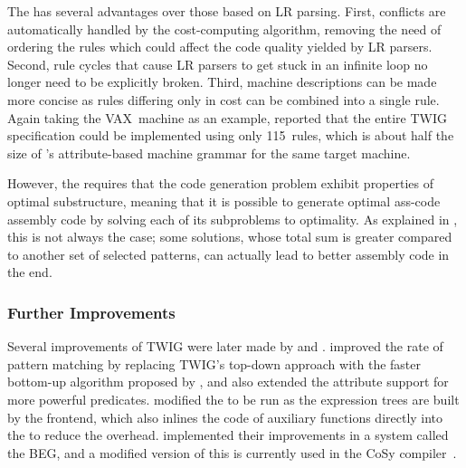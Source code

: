{The \tDPscheme has several advantages over those based on \gls{LR parsing}.
First,  conflicts are automatically handled by the
cost-computing algorithm, removing the need of ordering the \glspl{rule} which
could affect the code quality yielded by \glspl{LR parser}.
%
Second, \gls{rule}
cycles that cause \glspl{LR parser} to get stuck in an infinite loop no longer
need to be explicitly broken.
%
Third, machine descriptions can be made more
concise as \glspl{rule} differing only in cost can be combined into a single
\gls{rule}.
%
Again taking the \gls{VAX}~machine as an example, \citeauthor{Aho1989} reported
that the entire \gls{TWIG} specification could be implemented using only
115~\glspl{rule}, which is about half the size of \citeauthor{Ganapathi1982b}'s
\gls{attribute}-based \gls{machine grammar} for the same \gls{target machine}.

However, the \tDPapproach requires that the \gls{code generation} problem
exhibit properties of optimal substructure, meaning that it is possible to
generate \gls{optimal ass-code} \gls{assembly code} by solving each of its
subproblems to optimality.
%
As explained in , this is
not always the case; some solutions, whose total sum is greater compared to
another set of selected \glspl{pattern}, can actually lead to better
\gls{assembly code} in the end.


\subsubsection{Further Improvements}

Several improvements of \gls{TWIG} were later made by \textcite{Yates1988} and
\textcite{Emmelmann1989}.
%
\citeauthor{Yates1988} improved the rate of
\gls{pattern matching} by replacing \gls{TWIG}'s top-down approach with the
faster bottom-up algorithm proposed by \citeauthor{Hoffmann1982}, and also
extended the \gls{attribute} support for more powerful
\glspl{predicate}.
%
\citeauthor{Emmelmann1989} modified the \tDPalgorithm to be
run as the \glspl{expression tree} are built by the frontend, which also inlines
the code of auxiliary functions directly into the \tDPalgorithm to reduce the
overhead.
%
\citeauthor{Emmelmann1989} implemented their improvements in a system
called the \gls{BEG}, and a modified version of this is currently used in the
\gls{CoSy} \gls{compiler}~\cite{ACE2003}.


}
